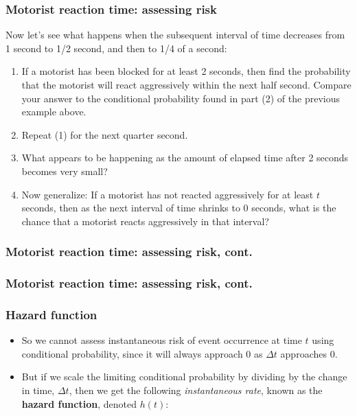 \begin{frame}
\frametitle{Motorist reaction time: assessing risk}
Now let's see what happens when the subsequent interval of time decreases from 1 second to 1/2 second, and then to 1/4 of a second:
\begin{enumerate}
\item If a motorist has been blocked for at least 2 seconds, then find the probability that the motorist will react aggressively within the next half second. Compare your answer to the conditional probability found in part (2) of the previous example above.

\item Repeat (1) for the next quarter second.

\item What appears to be happening as the amount of elapsed time after 2 seconds becomes very {small}?

\item Now generalize: If a motorist has not reacted aggressively for at least $t$ seconds, then as the next interval of time shrinks to 0 seconds, what is the chance that a motorist reacts aggressively in that interval?
\end{enumerate}
\end{frame}

\begin{frame}
\frametitle{Motorist reaction time: assessing risk, cont.}
\end{frame}

\begin{frame}
\frametitle{Motorist reaction time: assessing risk, cont.}
\end{frame}

\begin{frame}
\frametitle{Hazard function}
\begin{itemize}
\item So we cannot assess instantaneous risk of event occurrence at time $t$ using conditional probability, since it will always approach 0 as $\Delta t$ approaches 0.

\item But if we scale the limiting conditional probability by dividing by the change in time, $\Delta t$, then we get the following \textit{instantaneous rate}, known as the \textbf{hazard function}, denoted $h(t)$:
\end{itemize}
\vskip100pt
\end{frame}


